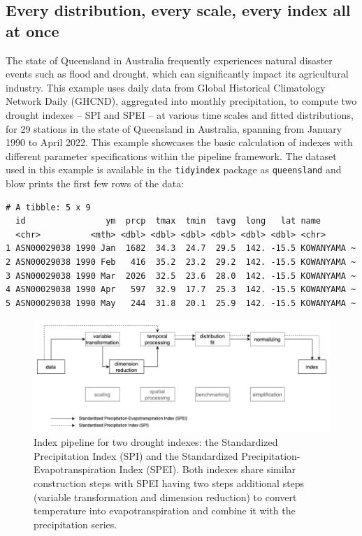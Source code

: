 \documentclass[
]{interact}
\begin{document}
\hypertarget{sec-example1}{%
\subsection{Every distribution, every scale, every index all at
once}\label{sec-example1}}

The state of Queensland in Australia frequently experiences natural
disaster events such as flood and drought, which can significantly
impact its agricultural industry. This example uses daily data from
Global Historical Climatology Network Daily (GHCND), aggregated into
monthly precipitation, to compute two drought indexes -- SPI and SPEI --
at various time scales and fitted distributions, for 29 stations in the
state of Queensland in Australia, spanning from January 1990 to April
2022. This example showcases the basic calculation of indexes with
different parameter specifications within the pipeline framework. The
dataset used in this example is available in the \texttt{tidyindex}
package as \texttt{queensland} and blow prints the first few rows of the
data:

\begin{verbatim}
# A tibble: 5 x 9
  id                ym  prcp  tmax  tmin  tavg  long   lat name       
  <chr>          <mth> <dbl> <dbl> <dbl> <dbl> <dbl> <dbl> <chr>      
1 ASN00029038 1990 Jan  1682  34.3  24.7  29.5  142. -15.5 KOWANYAMA ~
2 ASN00029038 1990 Feb   416  35.2  23.2  29.2  142. -15.5 KOWANYAMA ~
3 ASN00029038 1990 Mar  2026  32.5  23.6  28.0  142. -15.5 KOWANYAMA ~
4 ASN00029038 1990 Apr   597  32.9  17.7  25.3  142. -15.5 KOWANYAMA ~
5 ASN00029038 1990 May   244  31.8  20.1  25.9  142. -15.5 KOWANYAMA ~
\end{verbatim}

\begin{figure}

{\centering \includegraphics[width=1\textwidth,height=0.9\textheight]{figures/pipeline-spei.png}

}

\caption{\label{fig-spei}Index pipeline for two drought indexes: the
Standardized Precipitation Index (SPI) and the Standardized
Precipitation-Evapotranspiration Index (SPEI). Both indexes share
similar construction steps with SPEI having two steps additional steps
(variable transformation and dimension reduction) to convert temperature
into evapotranspiration and combine it with the precipitation series.}

\end{figure}
\end{document}
